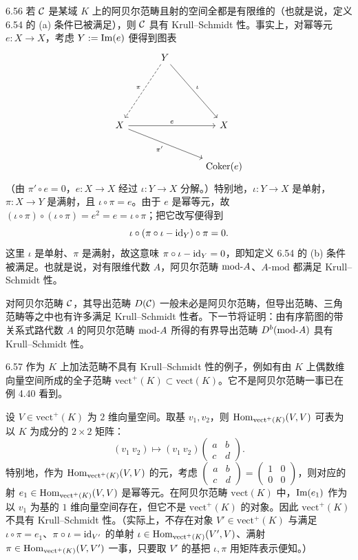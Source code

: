 \begin{example}{6.56}
若 $\mathcal{C}$ 是某域 $K$ 上的阿贝尔范畴且射的空间全都是有限维的（也就是说，定义 6.54 的 (a) 条件已被满足），则 $\mathcal{C}$ 具有 Krull--Schmidt 性。事实上，对幂等元 $e\colon X\to X$，考虑 $Y:=\operatorname{Im}(e)$ 便得到图表
\[\begin{tikzcd}[row sep=2.8em, column sep=3.0em]
  & Y \arrow[ddl,dashed,"\pi"'] \arrow[ddr,"\iota"] & \\
  & & \\
  X \arrow[rr,"e"] \arrow[drr,"\pi'"'] & & X \\
  & & \Coker(e)
\end{tikzcd}\]
（由 $\pi'\circ e=0$，$e\colon X\to X$ 经过 $\iota\colon Y\to X$ 分解。）特别地，$\iota\colon Y\to X$ 是单射，$\pi\colon X\to Y$ 是满射，且 $\iota\circ\pi=e$。由于 $e$ 是幂等元，故 $(\iota\circ\pi)\circ(\iota\circ\pi)=e^{2}=e=\iota\circ\pi$；把它改写便得到
\[
\iota\circ(\pi\circ\iota-\mathrm{id}_Y)\circ\pi=0.
\]
这里 $\iota$ 是单射、$\pi$ 是满射，故这意味 $\pi\circ\iota-\mathrm{id}_Y=0$，即知定义 6.54 的 (b) 条件被满足。也就是说，对有限维代数 $A$，阿贝尔范畴 $\mathrm{mod}\text{-}A$、$A\text{-}\mathrm{mod}$ 都满足 Krull--Schmidt 性。
\end{example}

对阿贝尔范畴 $\mathcal{C}$，其导出范畴 $D(\mathcal{C})$ 一般未必是阿贝尔范畴，但导出范畴、三角范畴等之中也有许多满足 Krull--Schmidt 性者。下一节将证明：由有序箭图的带关系式路代数 $A$ 的阿贝尔范畴 $\mathrm{mod}\text{-}A$ 所得的有界导出范畴 $D^{b}(\mathrm{mod}\text{-}A)$ 具有 Krull--Schmidt 性。

\begin{example}{6.57}
作为 $K$ 上加法范畴不具有 Krull--Schmidt 性的例子，例如有由 $K$ 上偶数维向量空间所成的全子范畴 $\mathrm{vect}^{+}(K)\subset\mathrm{vect}(K)$。它不是阿贝尔范畴一事已在例 4.40 看到。

设 $V\in\mathrm{vect}^{+}(K)$ 为 $2$ 维向量空间。取基 $v_1,v_2$，则 $\operatorname{Hom}_{\mathrm{vect}^{+}(K)}(V,V)$ 可表为以 $K$ 为成分的 $2\times 2$ 矩阵：
\[
(v_1\ v_2)\mapsto(v_1\ v_2)\begin{pmatrix}a&b\\ c&d\end{pmatrix}.
\]
特别地，作为 $\operatorname{Hom}_{\mathrm{vect}^{+}(K)}(V,V)$ 的元，考虑 $\begin{pmatrix}a&b\\ c&d\end{pmatrix}=\begin{pmatrix}1&0\\ 0&0\end{pmatrix}$，则对应的射 $e_1\in\operatorname{Hom}_{\mathrm{vect}^{+}(K)}(V,V)$ 是幂等元。在阿贝尔范畴 $\mathrm{vect}(K)$ 中，$\operatorname{Im}(e_1)$ 作为以 $v_1$ 为基的 $1$ 维向量空间存在，但它不是 $\mathrm{vect}^{+}(K)$ 的对象。因此 $\mathrm{vect}^{+}(K)$ 不具有 Krull--Schmidt 性。（实际上，不存在对象 $V'\in\mathrm{vect}^{+}(K)$ 与满足 $\iota\circ\pi=e_1$、$\pi\circ\iota=\mathrm{id}_{V'}$ 的单射 $\iota\in\operatorname{Hom}_{\mathrm{vect}^{+}(K)}(V',V)$、满射 $\pi\in\operatorname{Hom}_{\mathrm{vect}^{+}(K)}(V,V')$ 一事，只要取 $V'$ 的基把 $\iota,\pi$ 用矩阵表示便知。）
\end{example}

